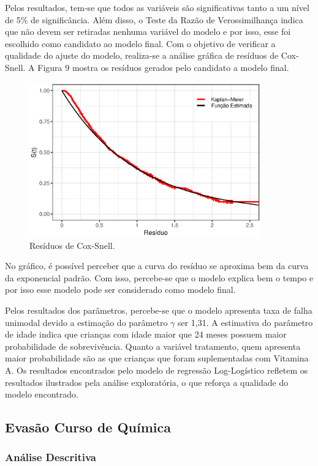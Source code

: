 \documentclass[a4paper,12pt]{article}
\begin{document}
Pelos resultados, tem-se que todos as variáveis são significativas tanto a um nível de 5\% de significância. Além disso, o Teste da Razão de Verossimilhança indica que não devem ser retiradas nenhuma variável do modelo e por isso, esse foi escolhido como candidato ao modelo final. 
Com o objetivo de verificar a qualidade do ajuste do modelo, realiza-se a análise gráfica de resíduos de Cox-Snell. A Figura 9 mostra os resíduos gerados pelo candidato a modelo final.

\begin{figure}[H] \label{fig:surv_vit}
  \begin{center}
    \includegraphics[width=10cm]{res_vit}
    \caption{Resíduos de Cox-Snell.}
  \end{center}
\end{figure}

No gráfico, é possível perceber que a curva do resíduo se aproxima bem da curva da exponencial padrão. Com isso, percebe-se que o modelo explica bem o tempo e por isso esse modelo pode ser considerado como modelo final.

Pelos resultados dos parâmetros, percebe-se que o modelo apresenta taxa de falha unimodal devido a estimação do parâmetro $\gamma$ ser 1,31. A estimativa do parâmetro de idade indica que crianças com idade maior que 24 meses possuem maior probabilidade de sobrevivência. Quanto a variável tratamento, quem apresenta maior probabilidade são as que crianças que foram suplementadas com Vitamina A. Os resultados encontrados pelo modelo de regressão Log-Logístico refletem os resultados ilustrados pela análise exploratória, o que reforça a qualidade do modelo encontrado.

\subsection{Evasão Curso de Química}
\subsubsection{Análise Descritiva}
\end{document}
